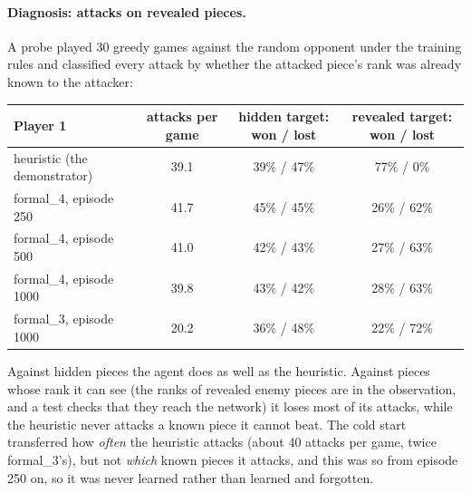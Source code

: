 \paragraph{Diagnosis: attacks on revealed pieces.} A probe played 30 greedy games against the
random opponent under the training rules and classified every attack by whether the attacked
piece's rank was already known to the attacker:
\begin{center}
\begin{tabular}{lccc}
\toprule
Player 1 & attacks per game & hidden target: won / lost & revealed target: won / lost \\
\midrule
heuristic (the demonstrator) & 39.1 & 39\% / 47\% & 77\% / 0\%  \\
formal\_4, episode 250       & 41.7 & 45\% / 45\% & 26\% / 62\% \\
formal\_4, episode 500       & 41.0 & 42\% / 43\% & 27\% / 63\% \\
formal\_4, episode 1000      & 39.8 & 43\% / 42\% & 28\% / 63\% \\
formal\_3, episode 1000      & 20.2 & 36\% / 48\% & 22\% / 72\% \\
\bottomrule
\end{tabular}
\end{center}
Against hidden pieces the agent does as well as the heuristic. Against pieces whose rank it can
see (the ranks of revealed enemy pieces are in the observation, and a test checks that they reach
the network) it loses most of its attacks, while the heuristic never attacks a known piece it
cannot beat. The cold start transferred how \emph{often} the heuristic attacks (about 40 attacks
per game, twice formal\_3's), but not \emph{which} known pieces it attacks, and this was so from
episode 250 on, so it was never learned rather than learned and forgotten.

